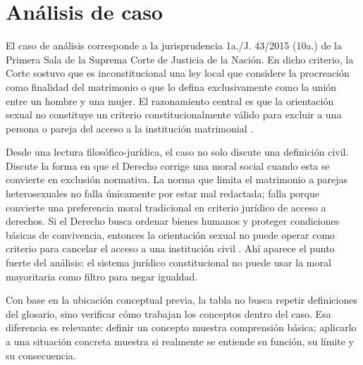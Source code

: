 \documentclass[
	spanish,
	letterpaper, oneside
]{article}
\begin{document}
\section{Análisis de caso}

El caso de análisis corresponde a la jurisprudencia 1a./J. 43/2015 (10a.) de la Primera Sala de la Suprema Corte de Justicia de la Nación. En dicho criterio, la Corte sostuvo que es inconstitucional una ley local que considere la procreación como finalidad del matrimonio o que lo defina exclusivamente como la unión entre un hombre y una mujer. El razonamiento central es que la orientación sexual no constituye un criterio constitucionalmente válido para excluir a una persona o pareja del acceso a la institución matrimonial \citep{scjnMatrimonio2015}.

Desde una lectura filosófico-jurídica, el caso no solo discute una definición civil. Discute la forma en que el Derecho corrige una moral social cuando esta se convierte en exclusión normativa. La norma que limita el matrimonio a parejas heterosexuales no falla únicamente por estar mal redactada; falla porque convierte una preferencia moral tradicional en criterio jurídico de acceso a derechos. Si el Derecho busca ordenar bienes humanos y proteger condiciones básicas de convivencia, entonces la orientación sexual no puede operar como criterio para cancelar el acceso a una institución civil \citep{finnisEstudiosTeoriaDerecho2017,scjnMatrimonio2015}. Ahí aparece el punto fuerte del análisis: el sistema jurídico constitucional no puede usar la moral mayoritaria como filtro para negar igualdad.

Con base en la ubicación conceptual previa, la tabla no busca repetir definiciones del glosario, sino verificar cómo trabajan los conceptos dentro del caso. Esa diferencia es relevante: definir un concepto muestra comprensión básica; aplicarlo a una situación concreta muestra si realmente se entiende su función, su límite y su consecuencia.
\end{document}
